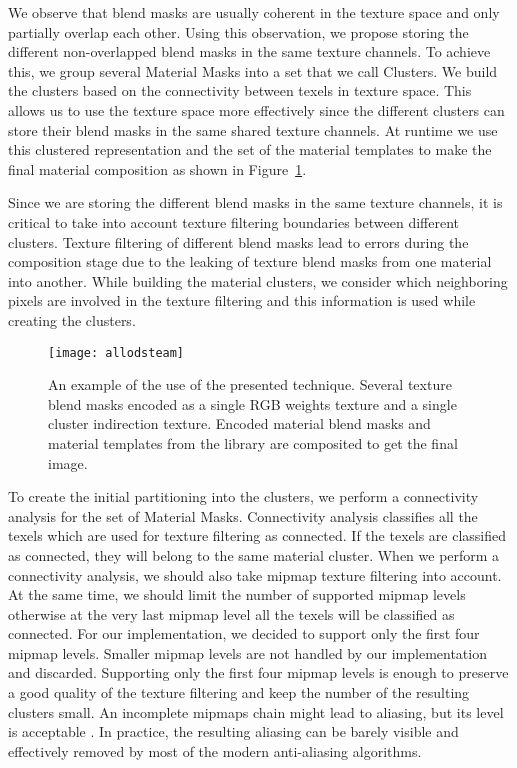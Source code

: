 We observe that blend masks are usually coherent in the texture space and only partially overlap each other.
Using this observation, we propose storing the different non-overlapped blend masks in the same texture channels.
To achieve this, we group several Material Masks into a set that we call Clusters.
We build the clusters based on the connectivity between texels in texture space.
This allows us to use the texture space more effectively since the different clusters can store their blend masks in the same shared texture channels.
At runtime we use this clustered representation and the set of the material templates to make the final material composition as shown in Figure~\ref{Makeev-TechniqueExample}.


Since we are storing the different blend masks in the same texture channels, it is critical to take into account texture filtering boundaries between different clusters.
Texture filtering of different blend masks lead to errors during the composition stage due to the leaking of texture blend masks from one material into another.
While building the material clusters, we consider which neighboring pixels are involved in the texture filtering and this information is used while creating the clusters.

\begin{figure}\centering
\texttt{[image: allodsteam]}
\caption{
An example of the use of the presented technique.
Several texture blend masks encoded as a single RGB weights texture and a single cluster indirection texture.
Encoded material blend masks and material templates from the library are composited to get the final image.
}
\label{Makeev-TechniqueExample}
\end{figure}

To create the initial partitioning into the clusters, we perform a connectivity analysis for the set of Material Masks.
Connectivity analysis classifies all the texels which are used for texture filtering as connected.
If the texels are classified as connected, they will belong to the same material cluster.
When we perform a connectivity analysis, we should also take mipmap texture filtering into account.
At the same time, we should limit the number of supported mipmap levels otherwise at the very last mipmap level all the texels will be classified as connected.
For our implementation, we decided to support only the first four mipmap levels.
Smaller mipmap levels are not handled by our implementation and discarded.
Supporting only the first four mipmap levels is enough to preserve a good quality of the texture filtering and keep the number of the resulting clusters small.
An incomplete mipmaps chain might lead to aliasing, but its level is acceptable \cite{VirtualTexturesMittring}.
In practice, the resulting aliasing can be barely visible and effectively removed by most of the modern anti-aliasing algorithms.


